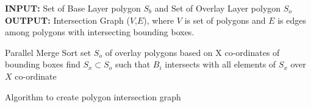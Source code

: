 \documentclass[12pt,a4paper]{article}
\begin{document}
\begin{algorithm}[H]

\textbf{INPUT:} Set of Base Layer polygon $S_b$ and Set of Overlay Layer polygon
$S_o$\\
\textbf{OUTPUT:} Intersection Graph ($V$,$E$), where $V$ is set of polygons and
$E$ is edges among polygons with intersecting bounding boxes.

	\begin{algorithmic}

	\STATE Parallel Merge Sort set $S_o$ of overlay polygons based on X co-ordinates
	of bounding boxes\footnotemark[1]
		\STATE find $S_x \subset S_o$ such that $B_i$ intersects with all elements
		of $S_x$ over $X$ co-ordinate
			\ENDIF
		\ENDFOR
	\ENDFOR

	\end{algorithmic}
	\caption{Algorithm to create polygon intersection graph}
	\label{algo:relgraph}

\end{algorithm}
\end{document}
